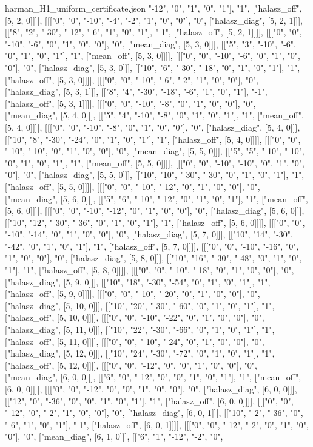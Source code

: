 \begin{filecontents*}[overwrite]{harman_H1_uniform_certificate.json}
"-12", "0", "1", "0", "1"], "1", ["halasz_off", [5, 2, 0]]]], [[["0", "0", "-10", "-4", "-2", "1", "0", "0"], "0", ["halasz_diag", [5, 2, 1]]], [["8", "2", "-30", "-12", "-6", "1", "0", "1"], "-1", ["halasz_off", [5, 2, 1]]]], [[["0", "0", "-10", "-6", "0", "1", "0", "0"], "0", ["mean_diag", [5, 3, 0]]], [["5", "3", "-10", "-6", "0", "1", "0", "1"], "1", ["mean_off", [5, 3, 0]]]], [[["0", "0", "-10", "-6", "0", "1", "0", "0"], "0", ["halasz_diag", [5, 3, 0]]], [["10", "6", "-30", "-18", "0", "1", "0", "1"], "1", ["halasz_off", [5, 3, 0]]]], [[["0", "0", "-10", "-6", "-2", "1", "0", "0"], "0", ["halasz_diag", [5, 3, 1]]], [["8", "4", "-30", "-18", "-6", "1", "0", "1"], "-1", ["halasz_off", [5, 3, 1]]]], [[["0", "0", "-10", "-8", "0", "1", "0", "0"], "0", ["mean_diag", [5, 4, 0]]], [["5", "4", "-10", "-8", "0", "1", "0", "1"], "1", ["mean_off", [5, 4, 0]]]], [[["0", "0", "-10", "-8", "0", "1", "0", "0"], "0", ["halasz_diag", [5, 4, 0]]], [["10", "8", "-30", "-24", "0", "1", "0", "1"], "1", ["halasz_off", [5, 4, 0]]]], [[["0", "0", "-10", "-10", "0", "1", "0", "0"], "0", ["mean_diag", [5, 5, 0]]], [["5", "5", "-10", "-10", "0", "1", "0", "1"], "1", ["mean_off", [5, 5, 0]]]], [[["0", "0", "-10", "-10", "0", "1", "0", "0"], "0", ["halasz_diag", [5, 5, 0]]], [["10", "10", "-30", "-30", "0", "1", "0", "1"], "1", ["halasz_off", [5, 5, 0]]]], [[["0", "0", "-10", "-12", "0", "1", "0", "0"], "0", ["mean_diag", [5, 6, 0]]], [["5", "6", "-10", "-12", "0", "1", "0", "1"], "1", ["mean_off", [5, 6, 0]]]], [[["0", "0", "-10", "-12", "0", "1", "0", "0"], "0", ["halasz_diag", [5, 6, 0]]], [["10", "12", "-30", "-36", "0", "1", "0", "1"], "1", ["halasz_off", [5, 6, 0]]]], [[["0", "0", "-10", "-14", "0", "1", "0", "0"], "0", ["halasz_diag", [5, 7, 0]]], [["10", "14", "-30", "-42", "0", "1", "0", "1"], "1", ["halasz_off", [5, 7, 0]]]], [[["0", "0", "-10", "-16", "0", "1", "0", "0"], "0", ["halasz_diag", [5, 8, 0]]], [["10", "16", "-30", "-48", "0", "1", "0", "1"], "1", ["halasz_off", [5, 8, 0]]]], [[["0", "0", "-10", "-18", "0", "1", "0", "0"], "0", ["halasz_diag", [5, 9, 0]]], [["10", "18", "-30", "-54", "0", "1", "0", "1"], "1", ["halasz_off", [5, 9, 0]]]], [[["0", "0", "-10", "-20", "0", "1", "0", "0"], "0", ["halasz_diag", [5, 10, 0]]], [["10", "20", "-30", "-60", "0", "1", "0", "1"], "1", ["halasz_off", [5, 10, 0]]]], [[["0", "0", "-10", "-22", "0", "1", "0", "0"], "0", ["halasz_diag", [5, 11, 0]]], [["10", "22", "-30", "-66", "0", "1", "0", "1"], "1", ["halasz_off", [5, 11, 0]]]], [[["0", "0", "-10", "-24", "0", "1", "0", "0"], "0", ["halasz_diag", [5, 12, 0]]], [["10", "24", "-30", "-72", "0", "1", "0", "1"], "1", ["halasz_off", [5, 12, 0]]]], [[["0", "0", "-12", "0", "0", "1", "0", "0"], "0", ["mean_diag", [6, 0, 0]]], [["6", "0", "-12", "0", "0", "1", "0", "1"], "1", ["mean_off", [6, 0, 0]]]], [[["0", "0", "-12", "0", "0", "1", "0", "0"], "0", ["halasz_diag", [6, 0, 0]]], [["12", "0", "-36", "0", "0", "1", "0", "1"], "1", ["halasz_off", [6, 0, 0]]]], [[["0", "0", "-12", "0", "-2", "1", "0", "0"], "0", ["halasz_diag", [6, 0, 1]]], [["10", "-2", "-36", "0", "-6", "1", "0", "1"], "-1", ["halasz_off", [6, 0, 1]]]], [[["0", "0", "-12", "-2", "0", "1", "0", "0"], "0", ["mean_diag", [6, 1, 0]]], [["6", "1", "-12", "-2", "0", 
\end{filecontents*}
